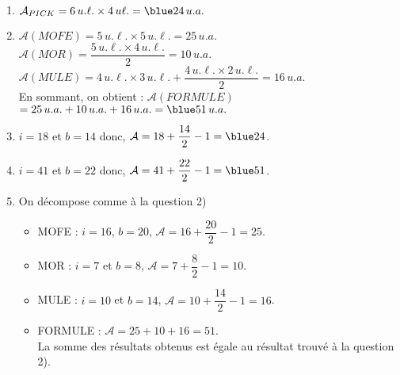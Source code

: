    \begin{enumerate}
      \item $\mathcal{A}_{PICK} =6\,u.\ell.\times4\,u\ell. ={\blue 24\,u.a.}$
      \item $\mathcal{A}(MOFE) =5\,u.\ell.\times5\,u.\ell. =25\,u.a.$ \\ [1mm]
         $\mathcal{A}(MOR) =\dfrac{5\,u.\ell.\times4\,u.\ell.}{2} =10\,u.a.$ \\ [1mm]
         $\mathcal{A}(MULE) =4\,u.\ell.\times3\,u.\ell.+\dfrac{4\,u.\ell.\times2\,u.\ell.}{2} =16\,u.a.$ \\ [1mm]
         En sommant, on obtient : $\mathcal{A}(FORMULE)$ \\
         $=25\,u.a.+10\,u.a.+16\,u.a. ={\blue 51\,u.a.}$ \smallskip
      \item {\blue $i =18$} et {\blue $b =14$} donc, $\mathcal{A} =18+\dfrac{14}{2}-1 ={\blue 24}$. \smallskip
      \item {\blue $i =41$} et {\blue $b =22$} donc, $\mathcal{A} =41+\dfrac{22}{2}-1 ={\blue 51}$. \smallskip
      \item On décompose comme à la question 2)
         \begin{itemize}
            \item MOFE : $i =16$, $b =20$, $\mathcal{A} =16+\dfrac{20}{2}-1 =25$. \smallskip
            \item MOR : $i =7$ et $b =8$, $\mathcal{A} =7+\dfrac{8}{2}-1 =10$. \smallskip
            \item MULE : $i =10$ et $b =14$, $\mathcal{A} =10+\dfrac{14}{2}-1 =16$. \smallskip
            \item FORMULE : $\mathcal{A} =25+10+16 =51$. \\
         {\blue La somme des résultats obtenus est égale au résultat trouvé à la question 2).}
      \end{itemize}
   \end{enumerate}
